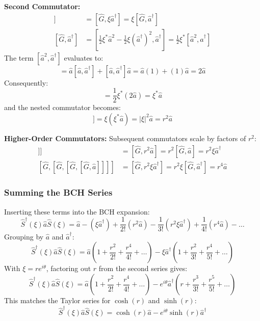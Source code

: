 {\textbf{Second Commutator:}
\begin{align*}
[\hat{G}, [\hat{G}, \hat{a}]] &= [\hat{G}, \xi\hat{a}^\dagger] = \xi[\hat{G}, \hat{a}^\dagger] \\
[\hat{G}, \hat{a}^\dagger] &= \left[ \frac{1}{2}\xi^*\hat{a}^2 - \frac{1}{2}\xi(\hat{a}^\dagger)^2, \hat{a}^\dagger \right] = \frac{1}{2}\xi^*[\hat{a}^2, \hat{a}^\dagger]
\end{align*}
The term $[\hat{a}^2, \hat{a}^\dagger]$ evaluates to:
\begin{equation*}
[\hat{a}^2, \hat{a}^\dagger] = \hat{a}[\hat{a}, \hat{a}^\dagger] + [\hat{a}, \hat{a}^\dagger]\hat{a} = \hat{a}(1) + (1)\hat{a} = 2\hat{a}
\end{equation*}
Consequently:
\begin{equation*}
[\hat{G}, \hat{a}^\dagger] = \frac{1}{2}\xi^*(2\hat{a}) = \xi^*\hat{a}
\end{equation*}
and the nested commutator becomes:
\begin{equation*}
[\hat{G}, [\hat{G}, \hat{a}]] = \xi(\xi^*\hat{a}) = |\xi|^2\hat{a} = r^2\hat{a}
\end{equation*}

\textbf{Higher-Order Commutators:}
Subsequent commutators scale by factors of $r^2$:
\begin{align*}
[\hat{G}, [\hat{G}, [\hat{G}, \hat{a}]]] &= [\hat{G}, r^2\hat{a}] = r^2[\hat{G}, \hat{a}] = r^2\xi\hat{a}^\dagger \\
[\hat{G}, [\hat{G}, [\hat{G}, [\hat{G}, \hat{a}]]]] &= [\hat{G}, r^2\xi\hat{a}^\dagger] = r^2\xi[\hat{G}, \hat{a}^\dagger] = r^4\hat{a}
\end{align*}

\subsubsection{Summing the BCH Series}
Inserting these terms into the BCH expansion:
\begin{equation*}
\hat{S}^\dagger(\xi) \hat{a} \hat{S}(\xi) = \hat{a} - (\xi\hat{a}^\dagger) + \frac{1}{2!}(r^2\hat{a}) - \frac{1}{3!}(r^2\xi\hat{a}^\dagger) + \frac{1}{4!}(r^4\hat{a}) - \dots
\end{equation*}
Grouping by $\hat{a}$ and $\hat{a}^\dagger$:
\begin{equation*}
\hat{S}^\dagger(\xi) \hat{a} \hat{S}(\xi) = \hat{a}\left(1 + \frac{r^2}{2!} + \frac{r^4}{4!} + \dots\right) - \xi\hat{a}^\dagger\left(1 + \frac{r^2}{3!} + \frac{r^4}{5!} + \dots\right)
\end{equation*}
With $\xi = r e^{i\theta}$, factoring out $r$ from the second series gives:
\begin{equation*}
\hat{S}^\dagger(\xi) \hat{a} \hat{S}(\xi) = \hat{a}\left(1 + \frac{r^2}{2!} + \frac{r^4}{4!} + \dots\right) - e^{i\theta}\hat{a}^\dagger\left(r + \frac{r^3}{3!} + \frac{r^5}{5!} + \dots\right)
\end{equation*}
This matches the Taylor series for $\cosh(r)$ and $\sinh(r)$:
\begin{equation*}
\hat{S}^\dagger(\xi) \hat{a} \hat{S}(\xi) = \cosh(r)\hat{a} - e^{i\theta}\sinh(r)\hat{a}^\dagger
\end{equation*}

}

